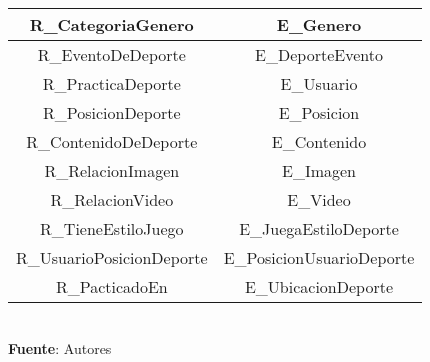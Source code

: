 \begin{table}[!htb]
\begin{center}
{\begin{tabular}{|p{4cm}|p{4cm}|p{4cm}|p{4cm}|}
			\hline
			\multicolumn{2}{|c|}{R\_CategoriaGenero} & 
			\multicolumn{2}{c|}{E\_Genero} \\
			\hline
			\multicolumn{2}{|c|}{R\_EventoDeDeporte} & 
			\multicolumn{2}{c|}{E\_DeporteEvento} \\
			\hline
			\multicolumn{2}{|c|}{R\_PracticaDeporte} & 
			\multicolumn{2}{c|}{E\_Usuario} \\
			\hline
			\multicolumn{2}{|c|}{R\_PosicionDeporte} & 
			\multicolumn{2}{c|}{E\_Posicion} \\
			\hline
			\multicolumn{2}{|c|}{R\_ContenidoDeDeporte} & 
			\multicolumn{2}{c|}{E\_Contenido} \\
			\hline
			\multicolumn{2}{|c|}{R\_RelacionImagen} & 
			\multicolumn{2}{c|}{E\_Imagen} \\
			\hline
			\multicolumn{2}{|c|}{R\_RelacionVideo} & 
			\multicolumn{2}{c|}{E\_Video} \\
			\hline
			\multicolumn{2}{|c|}{R\_TieneEstiloJuego} & 
			\multicolumn{2}{c|}{E\_JuegaEstiloDeporte} \\
			\hline
			\multicolumn{2}{|c|}{R\_UsuarioPosicionDeporte} & 
			\multicolumn{2}{c|}{E\_PosicionUsuarioDeporte} \\
			\hline
			\multicolumn{2}{|c|}{R\_PacticadoEn} & 
			\multicolumn{2}{c|}{E\_UbicacionDeporte} \\
			\hline
		\end{tabular}
		} \\
		\textbf{Fuente}: Autores
	\end{center}
\end{table}